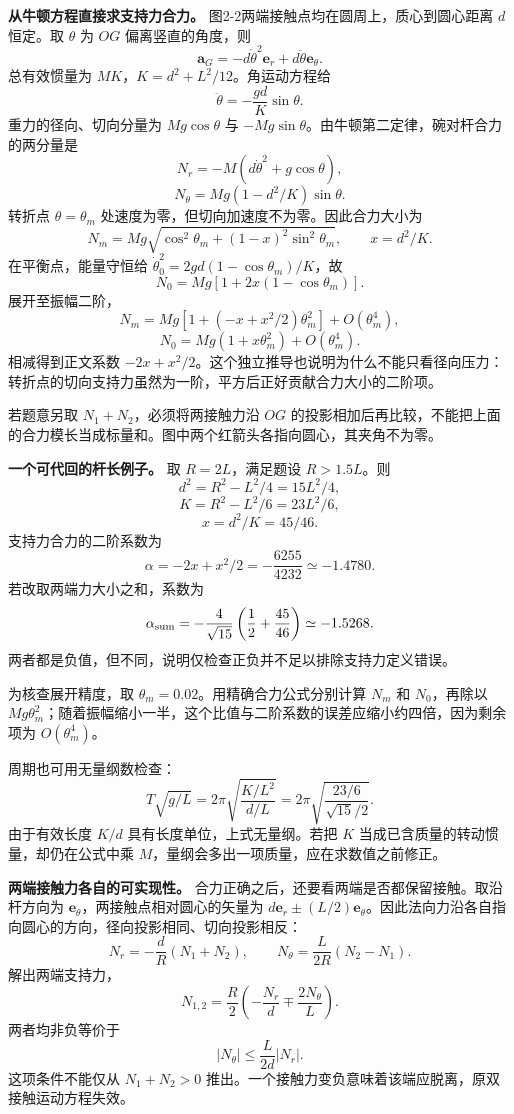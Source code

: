 \documentclass[12pt,a4paper,UTF8]{ctexart}
\begin{document}
\textbf{从牛顿方程直接求支持力合力。}
图2-2两端接触点均在圆周上，质心到圆心距离 \(d\) 恒定。取 \(\theta\) 为
\(OG\) 偏离竖直的角度，则 \[
\bm a_G=-d\dot\theta^2\bm e_r+d\ddot\theta\bm e_\theta.
\] 总有效惯量为 \(MK\)，\(K=d^2+L^2/12\)。角运动方程给 \[
\ddot\theta=-\frac{gd}{K}\sin\theta.
\] 重力的径向、切向分量为 \(Mg\cos\theta\) 与
\(-Mg\sin\theta\)。由牛顿第二定律，碗对杆合力的两分量是 \[
N_r=-M(d\dot\theta^2+g\cos\theta),
\] \[
N_\theta=Mg(1-d^2/K)\sin\theta.
\] 转折点 \(\theta=\theta_m\)
处速度为零，但切向加速度不为零。因此合力大小为 \[
N_m=Mg\sqrt{\cos^2\theta_m+(1-x)^2\sin^2\theta_m},\qquad x=d^2/K.
\] 在平衡点，能量守恒给 \(\dot\theta_0^2=2gd(1-\cos\theta_m)/K\)，故 \[
N_0=Mg[1+2x(1-\cos\theta_m)].
\] 展开至振幅二阶， \[
N_m=Mg[1+(-x+x^2/2)\theta_m^2]+O(\theta_m^4),
\] \[
N_0=Mg(1+x\theta_m^2)+O(\theta_m^4).
\] 相减得到正文系数
\(-2x+x^2/2\)。这个独立推导也说明为什么不能只看径向压力：转折点的切向支持力虽然为一阶，平方后正好贡献合力大小的二阶项。

若题意另取 \(N_1+N_2\)，必须将两接触力沿 \(OG\)
的投影相加后再比较，不能把上面的合力模长当成标量和。图中两个红箭头各指向圆心，其夹角不为零。

\textbf{一个可代回的杆长例子。} 取 \(R=2L\)，满足题设 \(R>1.5L\)。则 \[
d^2=R^2-L^2/4=15L^2/4,
\] \[
K=R^2-L^2/6=23L^2/6,
\] \[
x=d^2/K=45/46.
\] 支持力合力的二阶系数为 \[
\alpha=-2x+x^2/2=-\frac{6255}{4232}\simeq-1.4780.
\] 若改取两端力大小之和，系数为 \[
\alpha_{\rm sum}=-\frac{4}{\sqrt{15}}\left(\frac12+\frac{45}{46}\right)\simeq-1.5268.
\] 两者都是负值，但不同，说明仅检查正负并不足以排除支持力定义错误。

为核查展开精度，取 \(\theta_m=0.02\)。用精确合力公式分别计算 \(N_m\) 和
\(N_0\)，再除以
\(Mg\theta_m^2\)；随着振幅缩小一半，这个比值与二阶系数的误差应缩小约四倍，因为剩余项为
\(O(\theta_m^4)\)。

周期也可用无量纲数检查： \[
T\sqrt{g/L}=2\pi\sqrt{\frac{K/L^2}{d/L}}
=2\pi\sqrt{\frac{23/6}{\sqrt{15}/2}}.
\] 由于有效长度 \(K/d\) 具有长度单位，上式无量纲。若把 \(K\)
当成已含质量的转动惯量，却仍在公式中乘
\(M\)，量纲会多出一项质量，应在求数值之前修正。

\textbf{两端接触力各自的可实现性。}
合力正确之后，还要看两端是否都保留接触。取沿杆方向为
\(\bm e_\theta\)，两接触点相对圆心的矢量为
\(d\bm e_r\pm(L/2)\bm e_\theta\)。因此法向力沿各自指向圆心的方向，径向投影相同、切向投影相反：
\[
N_r=-\frac dR(N_1+N_2),
\qquad N_\theta=\frac L{2R}(N_2-N_1).
\] 解出两端支持力， \[
N_{1,2}=\frac R2\left(-\frac{N_r}{d}\mp\frac{2N_\theta}{L}\right).
\] 两者均非负等价于 \[
|N_\theta|\le\frac L{2d}|N_r|.
\] 这项条件不能仅从 \(N_1+N_2>0\)
推出。一个接触力变负意味着该端应脱离，原双接触运动方程失效。
\end{document}
